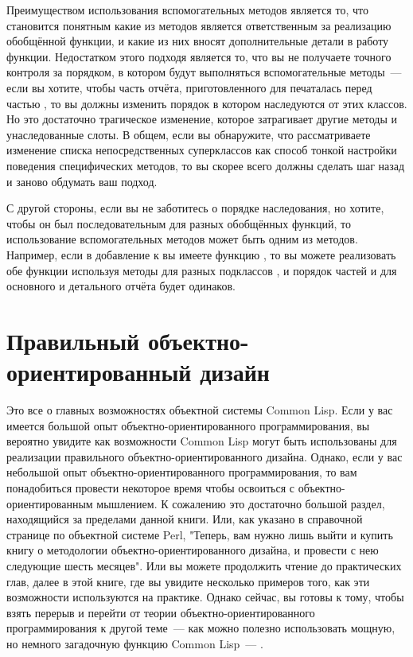 Преимуществом использования вспомогательных методов является то, что становится понятным
какие из методов является ответственным за реализацию обобщённой функции, и какие из них
вносят дополнительные детали в работу функции.  Недостатком этого подходя является то, что
вы не получаете точного контроля за порядком, в котором будут выполняться вспомогательные
методы~--- если вы хотите, чтобы часть отчёта, приготовленного для 
печаталась перед частью , то вы должны изменить порядок в котором
 наследуются от этих классов.  Но это достаточно трагическое
изменение, которое затрагивает другие методы и унаследованные слоты.  В общем, если вы
обнаружите, что рассматриваете изменение списка непосредственных суперклассов как способ
тонкой настройки поведения специфических методов, то вы скорее всего должны сделать шаг
назад и заново обдумать ваш подход.

С другой стороны, если вы не заботитесь о порядке наследования, но хотите, чтобы он был
последовательным для разных обобщённых функций, то использование вспомогательных методов
может быть одним из методов.  Например, если в добавление к  вы
имеете функцию , то вы можете реализовать обе функции
используя методы для разных подклассов , и порядок частей
и для основного и детального отчёта будет одинаков.


\section{Правильный объектно-ориентированный дизайн}

Это все о главных возможностях объектной системы Common Lisp.  Если у вас имеется большой
опыт объектно-ориентированного программирования, вы вероятно увидите как возможности
Common Lisp могут быть использованы для реализации правильного объектно-ориентированного
дизайна.  Однако, если у вас небольшой опыт объектно-ориентированного программирования, то
вам понадобиться провести некоторое время чтобы освоиться с объектно-ориентированным
мышлением.  К сожалению это достаточно большой раздел, находящийся за пределами данной
книги.  Или, как указано в справочной странице по объектной системе Perl, "Теперь, вам
нужно лишь выйти и купить книгу о методологии объектно-ориентированного дизайна, и
провести с нею следующие шесть месяцев".  Или вы можете продолжить чтение до практических
глав, далее в этой книге, где вы увидите несколько примеров того, как эти возможности
используются на практике.  Однако сейчас, вы готовы к тому, чтобы взять перерыв и перейти
от теории объектно-ориентированного программирования к другой теме~--- как можно полезно
использовать мощную, но немного загадочную функцию Common Lisp~--- .


